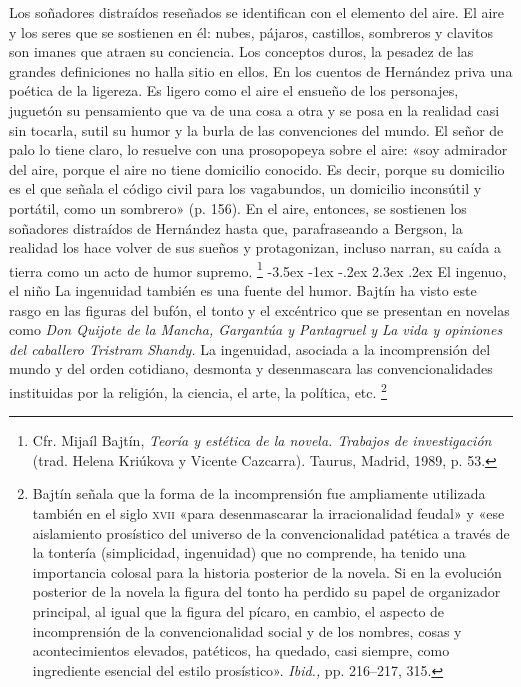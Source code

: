 \documentclass[14pt,twoside,final]{extbook} %
\makeatletter
\let\oldfootnote\footnote
\renewcommand\footnote[1]{%
\oldfootnote{\hspace{1mm}#1}}
\renewcommand\section{\@startsection {section}{1}{\z@}%
                                     {-3.5ex \@plus -1ex \@minus -.2ex}%
                                     {2.3ex \@plus .2ex}%
                                     {\normalfont\large\bfseries\sc}}
\makeatother
\begin{document}
Los soñadores distraídos reseñados se identifican con el elemento del aire. El aire y los seres que se sostienen en él: nubes, pájaros, castillos, sombreros y clavitos son imanes que atraen su conciencia. Los conceptos duros, la pesadez de las grandes definiciones no halla sitio en ellos. En los cuentos de Hernández priva una poética de la ligereza. Es ligero como el aire el ensueño de los personajes, juguetón su pensamiento que va de una cosa a otra y se posa en la realidad casi sin tocarla, sutil su humor y la burla de las convenciones del mundo. El señor de palo lo tiene claro, lo resuelve con una prosopopeya sobre el aire: «soy admirador del aire, porque el aire no tiene domicilio conocido. Es decir, porque su domicilio es el que señala el código civil para los vagabundos, un domicilio inconsútil y portátil, como un sombrero» (p. 156). En el aire, entonces, se sostienen los soñadores distraídos de Hernández hasta que, parafraseando a Bergson, la realidad los hace volver de sus sueños y protagonizan, incluso narran, su caída a tierra como un acto de humor supremo.\footnote{Cfr. Mijaíl Bajtín, \emph{Teoría y estética de la novela. Trabajos de investigación} (trad. Helena Kriúkova y Vicente Cazcarra). Taurus, Madrid, 1989, p. 53.}
\section{El ingenuo, el niño}\label{sec:el-ingenuo-el-nino}
La ingenuidad también es una fuente del humor. Bajtín ha visto este rasgo en las figuras del bufón, el tonto y el excéntrico que se presentan en novelas como \textit{Don Quijote de la Mancha, Gargantúa y Pantagruel \emph{y} La vida y opiniones del caballero Tristram Shandy.} La ingenuidad, asociada a la incomprensión del mundo y del orden cotidiano, desmonta y desenmascara las convencionalidades instituidas por la religión, la ciencia, el arte, la política, etc.\footnote{Bajtín señala que la forma de la incomprensión fue ampliamente utilizada también en el siglo \textsc{xvii} «para desenmascarar la irracionalidad feudal» y «ese aislamiento prosístico del universo de la convencionalidad patética a través de la tontería (simplicidad, ingenuidad) que no comprende, ha tenido una importancia colosal para la historia posterior de la novela. Si en la evolución posterior de la novela la figura del tonto ha perdido su papel de organizador principal, al igual que la figura del pícaro, en cambio, el aspecto de incomprensión de la convencionalidad social y de los nombres, cosas y acontecimientos elevados, patéticos, ha quedado, casi siempre, como ingrediente esencial del estilo prosístico». \emph{Ibid.,} pp. 216--217, 315.}
\end{document}
